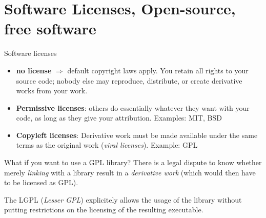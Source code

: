 \documentclass[compress]{beamer}
\begin{document}
\section[Licenses]{Software Licenses, Open-source, free software}

\begin{frame}[label=licenses]{Software licenses}
    \begin{itemize}
        \item<+-> {\bf no license} $\Rightarrow$ default copyright laws apply.
            You retain all rights to your source code; nobody else may
            reproduce, distribute, or create derivative works from your work.
        \item<+-> {\bf Permissive licenses}: others do essentially whatever they
            want with your code, as long as they give your attribution.
            Examples: MIT, BSD
        \item<+-> {\bf Copyleft licenses}: Derivative work must be made
            available under the same terms as the original work (\emph{viral
            licenses}). Example: GPL
    \end{itemize}


    \centering



\end{frame}

\begin{frame}{What if you want to use a GPL library?}
    There is a legal dispute to know whether merely \emph{linking} with a
    library result in a \emph{derivative work} (which would then have to be
    licensed as GPL).

    \pause

    The LGPL (\emph{Lesser GPL}) explicitely allows the usage of the library
    without putting restrictions on the licensing of the resulting executable.

\end{frame}
\end{document}
